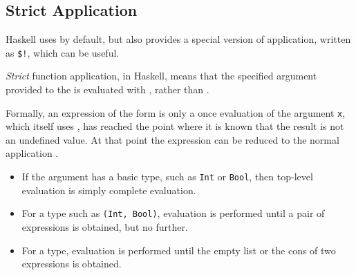 \subsection{Strict Application}\label{subsec:Strict_Application}
Haskell uses  by default, but also provides a special  version of  application, written as \texttt{\$!}, which can be useful.

\begin{definition}[Strict]\label{def:Strict}
  \emph{Strict} function application, in Haskell, means that the specified argument provided to the  is evaluated with , rather than .

  Formally, an expression of the form  is only a  once evaluation of the argument \texttt{x}, which itself uses , has reached the point where it is known that the result is not an undefined value.
  At that point the expression can be reduced to the normal application .
\end{definition}

\begin{itemize}[noitemsep]
\item If the argument has a basic type, such as \texttt{Int} or \texttt{Bool}, then top-level evaluation is simply complete evaluation.
\item For a  type such as \texttt{(Int, Bool)}, evaluation is performed until a pair of expressions is obtained, but no further.
\item For a  type, evaluation is performed until the empty list or the cons of two expressions is obtained.
\end{itemize}


